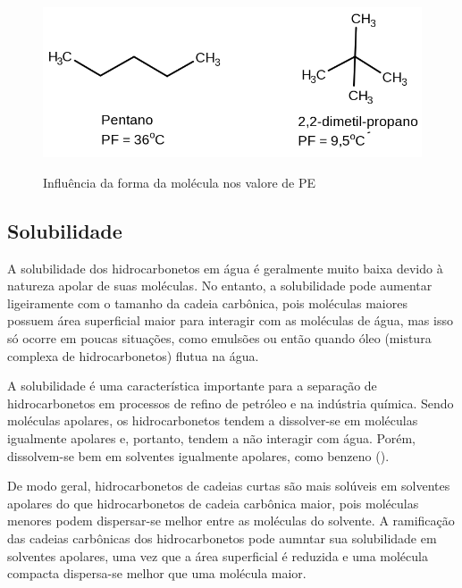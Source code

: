 \documentclass[a4paper,12pt]{book}
\begin{document}
\begin{figure}[h]
	\centering
	\caption{Influência da forma da molécula nos valore de PE}
	\vspace{0.5cm}
	\includegraphics[width=1\linewidth]{imagens/pentano_22dimetil.png}
\label{fig:pentano}
\end{figure}


\subsection{Solubilidade}

A solubilidade dos hidrocarbonetos em água é geralmente muito baixa devido à natureza apolar de suas moléculas. No entanto, a solubilidade pode aumentar ligeiramente com o tamanho da cadeia carbônica, pois moléculas maiores possuem área superficial maior para interagir com as moléculas de água, mas isso só ocorre em poucas situações, como emulsões ou então quando óleo (mistura complexa de hidrocarbonetos) flutua na água.

A solubilidade é uma característica importante para a separação de hidrocarbonetos em processos de refino de petróleo e na indústria química. Sendo moléculas apolares, os hidrocarbonetos tendem a dissolver-se em moléculas igualmente apolares e, portanto, tendem a não interagir com água. Porém, dissolvem-se bem em solventes igualmente apolares, como benzeno ().

De modo geral, hidrocarbonetos de cadeias curtas são mais solúveis em solventes apolares do que hidrocarbonetos de cadeia carbônica maior, pois moléculas menores podem dispersar-se melhor entre as moléculas do solvente. A ramificação das cadeias carbônicas dos hidrocarbonetos pode aumntar sua solubilidade em solventes apolares, uma vez que a área superficial é reduzida e uma molécula compacta dispersa-se melhor que uma molécula maior.
\end{document}
